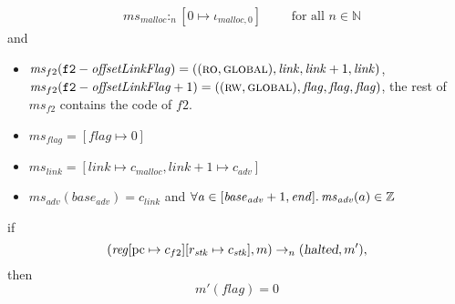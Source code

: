 \documentclass[a4paper]{article}
\newcommand{\update}[2]{[#1 \mapsto #2]}
\newcommand{\var}[1]{\mathit{#1}}
\newcommand{\hs}{\var{ms}}
\newcommand{\ms}{\hs}
\newcommand{\pcreg}{\mathrm{pc}}
\newcommand{\addr}{\var{a}}
\newcommand{\start}{\var{base}}
\newcommand{\addrend}{\var{end}}
\newcommand{\reg}{\var{reg}}
\newcommand{\heap}{\var{mem}}
\newcommand{\adv}{\var{adv}}
\newcommand{\link}{\var{link}}
\newcommand{\stk}{\var{stk}}
\newcommand{\flag}{\var{flag}}
\newcommand{\olf}{\var{offsetLinkFlag}}
\newcommand{\halted}{\textsl{halted}}
\newcommand{\heapSat}[3][\heap]{#1 :_{#2} #3}
\newcommand{\codelabel}[1]{\mathit{#1}}
\newcommand{\malloc}{\codelabel{malloc}}
\newcommand{\nats}{\mathbb{N}}
\newcommand{\ints}{\mathbb{Z}}
\newcommand{\plainperm}[1]{\textsc{#1}}
\newcommand{\readonly}{\plainperm{ro}}
\newcommand{\readwrite}{\plainperm{rw}}
\newcommand{\glob}{\plainperm{global}}
\newcommand{\step}[1][]{\rightarrow_{#1}}
\begin{document}
\begin{lemma}
\begin{align*}
    &\heapSat[\hs_{\malloc}]{n}{[0 \mapsto \iota_{\malloc,0}]} \qquad \text{ for all $n \in \nats$}
  \end{align*}
  and
  \begin{itemize}
  \item $\ms_{f2}(\mathtt{f2}-\olf) = ((\readonly,\glob),\link,\link+1,\link)$, $\ms_{f2}(\mathtt{f2}-\olf+1) = ((\readwrite,\glob),\flag,\flag,\flag)$, the rest of $\hs_{f2}$ contains the code of $f2$.
  \item $\ms_\flag = [\flag \mapsto 0]$
  \item $\ms_{\var{link}} = [\var{link} \mapsto c_\malloc, \var{link} + 1 \mapsto c_\adv]$
  \item $\hs_\adv(\start_\adv) = c_\link$ and $\forall \addr \in [\start_\adv+1,\addrend]\ldotp \ms_\adv(a) \in \ints$
  \end{itemize}
  if 
  \[
    (\reg\update{\pcreg}{c_{f2}}\update{r_\stk}{c_\stk},m) \step[n] (\halted,m'),
  \]
  then
  \[
    m'(\flag) = 0
  \]  
\end{lemma}
\end{document}
